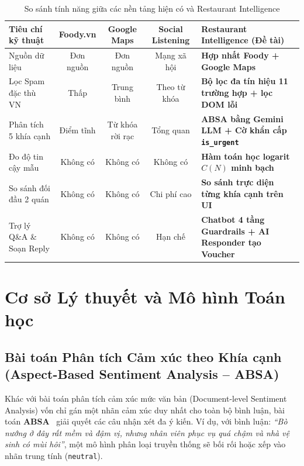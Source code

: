\documentclass[12pt, a4paper]{article}
\begin{document}
\begin{table}[H]
\centering
\caption{So sánh tính năng giữa các nền tảng hiện có và Restaurant Intelligence}
\label{tab:comparison}
\vspace{0.15cm}
\footnotesize
\begin{tabularx}{\textwidth}{l c c c X}
\toprule
\rowcolor{blue!8}
\textbf{Tiêu chí kỹ thuật} & \textbf{Foody.vn} & \textbf{Google Maps} & \textbf{Social Listening} & \textbf{Restaurant Intelligence (Đề tài)} \\
\midrule
Nguồn dữ liệu & Đơn nguồn & Đơn nguồn & Mạng xã hội & \textbf{Hợp nhất Foody + Google Maps} \\
\addlinespace
Lọc Spam đặc thù VN & Thấp & Trung bình & Theo từ khóa & \textbf{Bộ lọc đa tín hiệu 11 trường hợp + lọc DOM lỗi} \\
\addlinespace
Phân tích 5 khía cạnh & Điểm tĩnh & Từ khóa rời rạc & Tổng quan & \textbf{ABSA bằng Gemini LLM + Cờ khẩn cấp \texttt{is\_urgent}} \\
\addlinespace
Đo độ tin cậy mẫu & Không có & Không có & Không có & \textbf{Hàm toán học logarit $C(N)$ minh bạch} \\
\addlinespace
So sánh đối đầu 2 quán & Không có & Không có & Chi phí cao & \textbf{So sánh trực diện từng khía cạnh trên UI} \\
\addlinespace
Trợ lý Q\&A \& Soạn Reply & Không có & Không có & Hạn chế & \textbf{Chatbot 4 tầng Guardrails + AI Responder tạo Voucher} \\
\bottomrule
\end{tabularx}
\end{table}

\newpage
\section{Cơ sở Lý thuyết và Mô hình Toán học}

\subsection{Bài toán Phân tích Cảm xúc theo Khía cạnh (Aspect-Based Sentiment Analysis -- ABSA)}
Khác với bài toán phân tích cảm xúc mức văn bản (Document-level Sentiment Analysis) vốn chỉ gán một nhãn cảm xúc duy nhất cho toàn bộ bình luận, bài toán \textbf{ABSA}~\cite{pontiki2014, zhang2022} giải quyết các câu nhận xét đa ý kiến. Ví dụ, với bình luận: \textit{``Bò nướng ở đây rất mềm và đậm vị, nhưng nhân viên phục vụ quá chậm và nhà vệ sinh có mùi hôi''}, một mô hình phân loại truyền thống sẽ bối rối hoặc xếp vào nhãn trung tính (\texttt{neutral}). 
\end{document}
